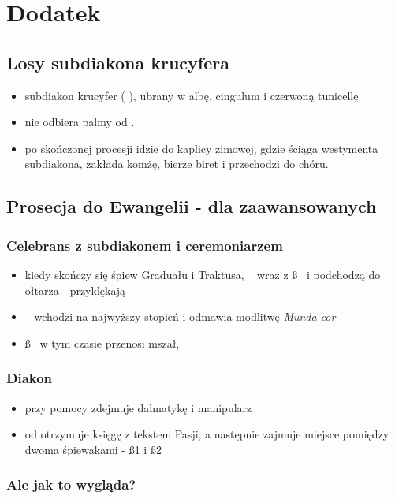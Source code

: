 \section{Dodatek}
\subsection{Losy subdiakona krucyfera}
\begin{itemize}
  \item subdiakon krucyfer (  ), ubrany w albę, cingulum i czerwoną
        tunicellę
  \item nie odbiera palmy od \ii.
  \item po skończonej procesji idzie do kaplicy zimowej, gdzie ściąga westymenta
        subdiakona, zakłada komżę, bierze biret i przechodzi do chóru.
\end{itemize}


\subsection{Prosecja do Ewangelii - dla zaawansowanych}
\label{E}
\subsubsection*{\textbf{Celebrans z subdiakonem i ceremoniarzem }}
\begin{itemize}
  \item kiedy skończy się śpiew Graduału i Traktusa, \ii~ wraz z
        \ss~ i  podchodzą do ołtarza - przyklękają
  \item \ii~ wchodzi na najwyższy stopień i odmawia modlitwę \textit{Munda cor}
  \item \ss~ w tym czasie przenosi mszał,
\end{itemize}

\subsubsection*{\textbf{Diakon}}
\begin{itemize}
  \item przy pomocy  zdejmuje dalmatykę i manipularz
  \item od  otrzymuje księgę z tekstem Pasji, a następnie zajmuje
        miejsce pomiędzy dwoma śpiewakami - \ss1 i \ss2
\end{itemize}

\subsubsection*{\textbf{Ale jak to wygląda?}}


